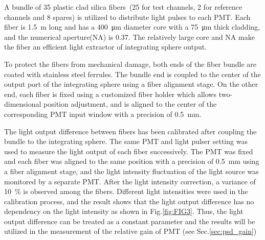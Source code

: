 \documentclass[a4paper,10pt,twoside]{cpc-hepnp}
\begin{document}
\begin{CJK*}{UTF8}{gbsn}
\begin{multicols}{2}
A bundle of 35 plastic clad silica fibers~\citep{optical_fibre}(25 for test channels, 2 for reference channels and 8 spares) is utilized to distribute light pulses to each PMT.
Each fiber is \SI{1.5}{\meter} long and has a \SI{400}{\micro\meter} diameter core with a \SI{75}{\micro\meter} thick cladding, and the numerical aperture(NA) is 0.37.
The relatively large core and NA make the fiber an efficient light extractor of integrating sphere output. 

To protect the fibers from mechanical damage, both ends of the fiber bundle are coated with stainless steel ferrules.
The bundle end is coupled to the center of the output port of the integrating sphere using a fiber alignment stage.
On the other end, each fiber is fixed using a customized fiber holder which allows two-dimensional position adjustment, and is aligned to the center of the corresponding PMT input window with a precision of \SI{0.5}{\milli\meter}.

The light output difference between fibers has been calibrated after coupling the bundle to the integrating sphere.
The same PMT and light pulser setting was used to measure the light output of each fiber successively.
The PMT was fixed and each fiber was aligned to the same position with a precision of \SI{0.5}{\milli\meter} using a fiber alignment stage, and the light intensity fluctuation of the light source was monitored by a separate PMT.
After the light intensity correction, a variance of \SI{10}{\percent} is observed among the fibers.
Different light intensities were used in the calibration process, and the result shows that the light output difference has no dependency on the light intensity as shown in Fig.\ref{fig:FIG3}. 
Thus, the light output difference can be treated as a constant parameter and the results will be utilized in the measurement of the relative gain of PMT (see Sec.\ref{sec:psd_gain})


\end{multicols}
\end{CJK*}
\end{document}
